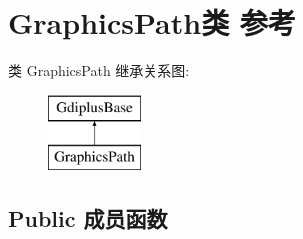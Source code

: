 \hypertarget{class_graphics_path}{}\section{Graphics\+Path类 参考}
\label{class_graphics_path}
类 Graphics\+Path 继承关系图\+:\begin{figure}[H]
\begin{center}
\leavevmode
\includegraphics[height=2.000000cm]{class_graphics_path}
\end{center}
\end{figure}
\subsection*{Public 成员函数}

